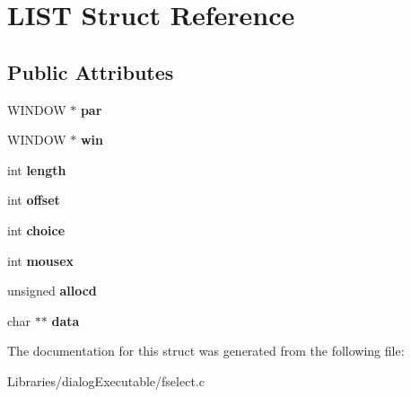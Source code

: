 \hypertarget{struct_l_i_s_t}{}\section{L\+I\+ST Struct Reference}
\label{struct_l_i_s_t}
\subsection*{Public Attributes}
\begin{DoxyCompactItemize}
\item 
W\+I\+N\+D\+OW $\ast$ {\bfseries par}\hypertarget{struct_l_i_s_t_a0e313d55675ebc2e6f891fbd7e632450}{}\label{struct_l_i_s_t_a0e313d55675ebc2e6f891fbd7e632450}

\item 
W\+I\+N\+D\+OW $\ast$ {\bfseries win}\hypertarget{struct_l_i_s_t_ae7a671c514c0c22068f3f0b6bedfc45f}{}\label{struct_l_i_s_t_ae7a671c514c0c22068f3f0b6bedfc45f}

\item 
int {\bfseries length}\hypertarget{struct_l_i_s_t_a866f64374f9aba4f85ceae5fd7c011b6}{}\label{struct_l_i_s_t_a866f64374f9aba4f85ceae5fd7c011b6}

\item 
int {\bfseries offset}\hypertarget{struct_l_i_s_t_a7acb724f07dbda94559460c013a57626}{}\label{struct_l_i_s_t_a7acb724f07dbda94559460c013a57626}

\item 
int {\bfseries choice}\hypertarget{struct_l_i_s_t_a5abec3d3b694cf47d5e180236beec9d5}{}\label{struct_l_i_s_t_a5abec3d3b694cf47d5e180236beec9d5}

\item 
int {\bfseries mousex}\hypertarget{struct_l_i_s_t_ac7d635b01854db30cdeb89e376516b2a}{}\label{struct_l_i_s_t_ac7d635b01854db30cdeb89e376516b2a}

\item 
unsigned {\bfseries allocd}\hypertarget{struct_l_i_s_t_a3ea7ec61a8734fb33f33dfa4c29b8cce}{}\label{struct_l_i_s_t_a3ea7ec61a8734fb33f33dfa4c29b8cce}

\item 
char $\ast$$\ast$ {\bfseries data}\hypertarget{struct_l_i_s_t_ae408f25dba5fbbb454bc825d3c40f537}{}\label{struct_l_i_s_t_ae408f25dba5fbbb454bc825d3c40f537}

\end{DoxyCompactItemize}


The documentation for this struct was generated from the following file\+:\begin{DoxyCompactItemize}
\item 
Libraries/dialog\+Executable/fselect.\+c\end{DoxyCompactItemize}
